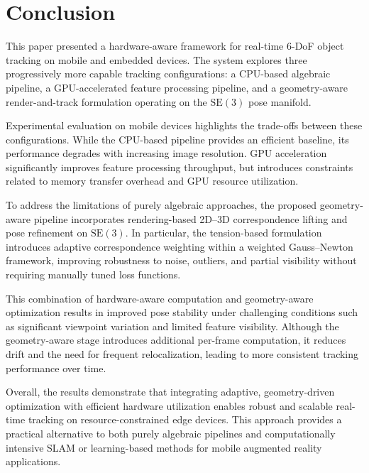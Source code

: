 \section{Conclusion}

This paper presented a hardware-aware framework for real-time 6-DoF object tracking on mobile and embedded devices. The system explores three progressively more capable tracking configurations: a CPU-based algebraic pipeline, a GPU-accelerated feature processing pipeline, and a geometry-aware render-and-track formulation operating on the $\mathrm{SE}(3)$ pose manifold.

Experimental evaluation on mobile devices highlights the trade-offs between these configurations. While the CPU-based pipeline provides an efficient baseline, its performance degrades with increasing image resolution. GPU acceleration significantly improves feature processing throughput, but introduces constraints related to memory transfer overhead and GPU resource utilization. 

To address the limitations of purely algebraic approaches, the proposed geometry-aware pipeline incorporates rendering-based 2D--3D correspondence lifting and pose refinement on $\mathrm{SE}(3)$. In particular, the tension-based formulation introduces adaptive correspondence weighting within a weighted Gauss--Newton framework, improving robustness to noise, outliers, and partial visibility without requiring manually tuned loss functions.

This combination of hardware-aware computation and geometry-aware optimization results in improved pose stability under challenging conditions such as significant viewpoint variation and limited feature visibility. Although the geometry-aware stage introduces additional per-frame computation, it reduces drift and the need for frequent relocalization, leading to more consistent tracking performance over time.

Overall, the results demonstrate that integrating adaptive, geometry-driven optimization with efficient hardware utilization enables robust and scalable real-time tracking on resource-constrained edge devices. This approach provides a practical alternative to both purely algebraic pipelines and computationally intensive SLAM or learning-based methods for mobile augmented reality applications.
